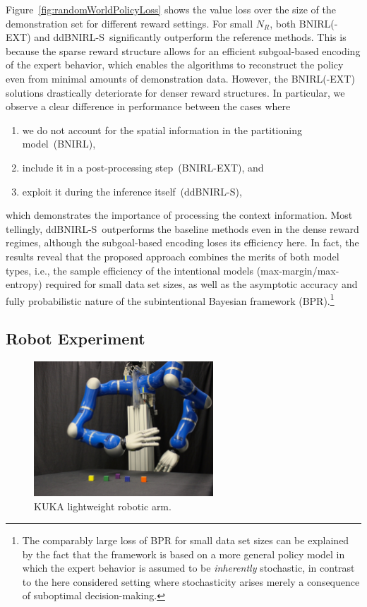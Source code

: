 \documentclass[twoside,11pt]{article}
\newcommand{\first}{(i)}
\newcommand{\second}{(ii)}
\newcommand{\third}{(iii)}
\newcommand{\ie}{i.e.}
\newcommand{\ddBNIRLS}{\mbox{ddBNIRL-S}}
\begin{document}
Figure~\ref{fig:randomWorldPolicyLoss} shows the value loss over %
the size of the demonstration set for different reward settings.
For small $N_R$, both BNIRL(-EXT) and \ddBNIRLS\ significantly outperform the reference methods. This is because the sparse reward structure allows for 
an efficient subgoal-based encoding of the 
%
expert behavior, %
which enables the algorithms to reconstruct %
the %
policy even from minimal amounts of demonstration data. However, the BNIRL(-EXT) solutions drastically deteriorate for denser reward structures. 
In particular, we observe a clear difference in performance between the cases where 
\begin{enumerate}[topsep=-\parskip+1.5ex, itemsep=1ex, parsep=0mm]
\item[\first] we do not account for the spatial information in the partitioning model~(BNIRL), 
\item[\second] include it in a post-processing step~(BNIRL-EXT), and
\item[\third] exploit it during the inference itself~(ddBNIRL-S), 
\end{enumerate}
which demonstrates the importance of %
processing the context information.
Most %
tellingly, \ddBNIRLS\  outperforms the baseline methods even in the dense reward regimes, although the subgoal-based encoding loses its efficiency here.
%
%
%
%
%
%
%
%
%
In fact, the results reveal that the proposed approach combines the %
merits of both model types, \ie, the sample efficiency of the intentional models (max-margin/max-entropy) required for small data set sizes, as well as the asymptotic accuracy and fully probabilistic nature of the subintentional Bayesian framework (BPR).\footnote{The comparably large loss of BPR for small data set sizes can be explained by the fact that the framework %
%
is based on a more general policy model in which the expert behavior is assumed to be \textit{inherently} stochastic, in contrast to the here considered setting where stochasticity arises merely a consequence of suboptimal decision-making.} %






\subsection{Robot Experiment}
\label{sec:robotExperiment}
\begin{figure}
	\centering
	\includegraphics[width=0.6\textwidth]{images/robot_small.jpg}
	\caption{KUKA lightweight robotic arm.}
	\label{fig:KUKA}
\end{figure}
\end{document}
